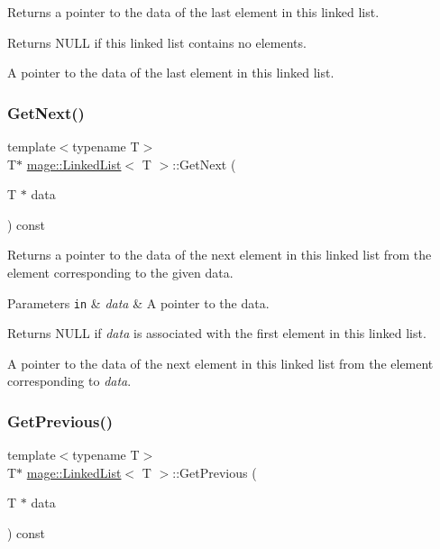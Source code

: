 Returns a pointer to the data of the last element in this linked list.

\begin{DoxyReturn}{Returns}
{\ttfamily N\+U\+LL} if this linked list contains no elements. 

A pointer to the data of the last element in this linked list. 
\end{DoxyReturn}
\hypertarget{classmage_1_1_linked_list_a992390dbc48cf24705f9e79baef37061}{}\label{classmage_1_1_linked_list_a992390dbc48cf24705f9e79baef37061} 
\subsubsection{\texorpdfstring{Get\+Next()}{GetNext()}}
{\footnotesize\ttfamily template$<$typename T$>$ \\
T$\ast$ \hyperlink{classmage_1_1_linked_list}{mage\+::\+Linked\+List}$<$ T $>$\+::Get\+Next (\begin{DoxyParamCaption}\item[{T $\ast$}]{data }\end{DoxyParamCaption}) const}

Returns a pointer to the data of the next element in this linked list from the element corresponding to the given data.


\begin{DoxyParams}[1]{Parameters}
\mbox{\tt in}  & {\em data} & A pointer to the data. \\
\hline
\end{DoxyParams}
\begin{DoxyReturn}{Returns}
{\ttfamily N\+U\+LL} if {\itshape data} is associated with the first element in this linked list. 

A pointer to the data of the next element in this linked list from the element corresponding to {\itshape data}. 
\end{DoxyReturn}
\hypertarget{classmage_1_1_linked_list_a48a61ad79c7a7f4d460d56867ce62cf4}{}\label{classmage_1_1_linked_list_a48a61ad79c7a7f4d460d56867ce62cf4} 
\subsubsection{\texorpdfstring{Get\+Previous()}{GetPrevious()}}
{\footnotesize\ttfamily template$<$typename T$>$ \\
T$\ast$ \hyperlink{classmage_1_1_linked_list}{mage\+::\+Linked\+List}$<$ T $>$\+::Get\+Previous (\begin{DoxyParamCaption}\item[{T $\ast$}]{data }\end{DoxyParamCaption}) const}

